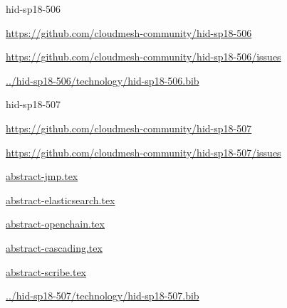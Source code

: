 \begin{IU}

hid-sp18-506

\url{https://github.com/cloudmesh-community/hid-sp18-506}

\url{https://github.com/cloudmesh-community/hid-sp18-506/issues}

\href{https://github.com/cloudmesh-community/hid-sp18-506/blob/master//technology/hid-sp18-506.bib}{../hid-sp18-506/technology/hid-sp18-506.bib}

\end{IU}


\begin{IU}

hid-sp18-507

\url{https://github.com/cloudmesh-community/hid-sp18-507}

\url{https://github.com/cloudmesh-community/hid-sp18-507/issues}

\href{https://github.com/cloudmesh-community/hid-sp18-507/blob/master//technology/abstract-jmp.tex}{abstract-jmp.tex}

\href{https://github.com/cloudmesh-community/hid-sp18-507/blob/master//technology/abstract-elasticsearch.tex}{abstract-elasticsearch.tex}

\href{https://github.com/cloudmesh-community/hid-sp18-507/blob/master//technology/abstract-openchain.tex}{abstract-openchain.tex}

\href{https://github.com/cloudmesh-community/hid-sp18-507/blob/master//technology/abstract-cascading.tex}{abstract-cascading.tex}

\href{https://github.com/cloudmesh-community/hid-sp18-507/blob/master//technology/abstract-scribe.tex}{abstract-scribe.tex}

\href{https://github.com/cloudmesh-community/hid-sp18-507/blob/master//technology/hid-sp18-507.bib}{../hid-sp18-507/technology/hid-sp18-507.bib}

\end{IU}


